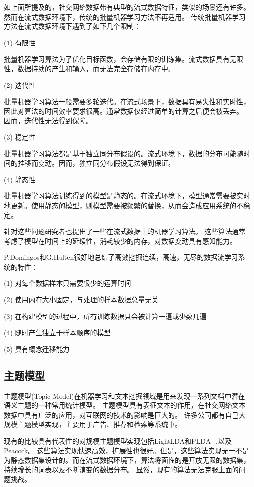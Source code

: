 如上面所提及的，社交网络数据带有典型的流式数据特征，类似的场景还有许多。然而在流式数据环境下，传统的批量机器学习方法不再适用。
传统批量机器学习方法在流式数据环境下遇到了如下几个限制：

(1) 有限性

批量机器学习算法为了优化目标函数，会存储有限的训练集。流式数据具有无限性，数据持续的产生和输入，而无法完全存储在内存中。

(2) 迭代性

批量机器学习算法一般需要多轮迭代。在流式场景下，数据具有易失性和实时性，因此对算法的时间效率要求很高。通常数据仅经过简单的计算之后便会被丢弃。
因而，迭代性无法得到保障。

(3) 稳定性

批量机器学习算法都是基于独立同分布假设的。流式环境下，数据的分布可能随时间的推移而变动。因而，独立同分布假设无法得到保证。

(4) 静态性

批量机器学习算法训练得到的模型是静态的。在流式环境下，模型通常需要被实时地更新。使用静态的模型，则模型需要被频繁的替换，从而会造成应用系统的不稳定。

针对这些问题研究者也提出了一些在流式数据上的机器学习算法。
这些算法通常考虑了模型在时间上的延续性，消耗较少的内存，对数据变动具有感知能力。

P.Domingos和G.Hulten\cite{Domingos01catchingup}很好地总结了高效挖掘连续，高速，无尽的数据流学习系统的特性：

(1) 对每个数据样本只需要很少的运算时间

(2) 使用内存大小固定，与处理的样本数据总量无关

(3) 在构建模型的过程中，所有训练数据只会被计算一遍或少数几遍

(4) 随时产生独立于样本顺序的模型

(5) 具有概念迁移能力

\subsection{主题模型}
主题模型(Topic Model)在机器学习和文本挖掘领域是用来发现一系列文档中潜在语义主题的一种常用统计模型。
主题模型具有表征文本的作用，在社交网络文本数据中具有广泛的应用，对互联网的技术的影响是巨大的。
许多公司都有自己大规模主题模型实现，主要用于广告、推荐和检索等系统中。

现有的比较具有代表性的对规模主题模型实现包括LightLDA\cite{yuan2015lightlda}和PLDA+\cite{Liu:2011:PPL:1961189.1961198},以及Peacock\cite{Peacock}。
这些算法实现快速高效，扩展性也很好。但是，这些算法实现无一不是为静态数据集设计的。而在流式数据环境下，算法将面临的是开放无限的数据集，持续增长的词表以及不断演变的数据分布。
显然，现有的算法无法克服上面的问题挑战。

